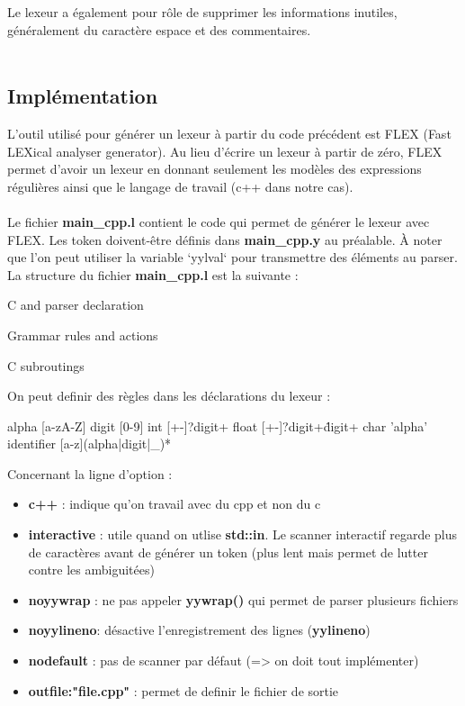 \documentclass[a4paper]{article}
\begin{document}
Le lexeur a également pour rôle de supprimer les informations inutiles, généralement du caractère espace et des commentaires.\\~\\


\subsection{Implémentation}

L'outil utilisé pour générer un lexeur à partir du code précédent est FLEX (Fast LEXical analyser generator). Au lieu d'écrire un lexeur à partir de zéro, FLEX permet d'avoir un lexeur en donnant seulement les modèles des expressions régulières ainsi que le langage de travail (c++ dans notre cas).\\~\\
\noindent
Le fichier \textbf{main\_cpp.l} contient le code qui permet de générer le lexeur avec FLEX. Les token doivent-être définis dans \textbf{main\_cpp.y} au préalable.
À noter que l'on peut utiliser la variable `yylval` pour transmettre des
éléments au parser.\\

La structure du fichier \textbf{main\_cpp.l} est la suivante :

\begin{code}
C and parser declaration

Grammar rules and actions

C subroutings
\end{code}\leavevmode\newline


\noindent
On peut definir des règles dans les déclarations du lexeur :

\begin{code}

alpha [a-zA-Z]
digit [0-9]
int [+-]?{digit}+
float [+-]?{digit}+\.{digit}+
char '{alpha}'
identifier [a-z]({alpha}|{digit}|_)*
\end{code}\leavevmode\newline

\noindent
Concernant la ligne d'option :
\begin{itemize}
\item \textbf{c++} : indique qu'on travail avec du cpp et non du c
\item \textbf{interactive} : utile quand on utlise \textbf{std::in}. Le scanner interactif regarde plus de caractères avant de générer un token (plus lent mais permet de lutter contre les ambiguitées)
\item \textbf{noyywrap} : ne pas appeler \textbf{yywrap()} qui permet de parser plusieurs fichiers
\item \textbf{noyylineno}: désactive l'enregistrement des lignes (\textbf{yylineno})
\item \textbf{nodefault} : pas de scanner par défaut (=> on doit tout implémenter)
\item \textbf{outfile:"file.cpp"} : permet de definir le fichier de sortie
\end{itemize}\leavevmode\\[3\baselineskip]
\end{document}
